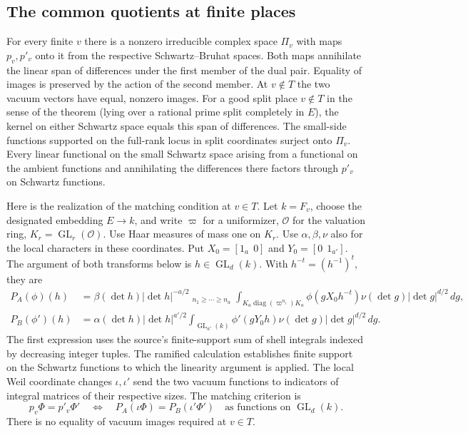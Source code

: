 \subsection{The common quotients at finite places}

For every finite \(v\) there is a nonzero irreducible complex space
\(\Pi_v\) with maps \(p_v,p'_v\) onto it from the respective
Schwartz--Bruhat spaces. Both maps annihilate the linear span of
differences under the first member of the dual pair. Equality of
images is preserved by the action of the second member. At \(v\notin T\)
the two vacuum vectors have equal, nonzero images. For a good split
place \(v\notin T\) in the sense of the theorem (lying over a rational
prime split completely in \(E\)), the kernel on either Schwartz space
equals this span of differences. The small-side functions supported
on the full-rank locus in split coordinates surject onto \(\Pi_v\).
Every linear functional on the small Schwartz space arising from a
functional on the ambient functions and annihilating the differences
there factors through \(p'_v\) on Schwartz functions.

Here is the realization of the matching condition at \(v\in T\).
Let \(k=F_v\), choose the designated embedding \(E\longrightarrow k\),
and write \(\varpi\) for a uniformizer, \(\mathcal O\) for the
valuation ring, \(K_r=\operatorname{GL}_r(\mathcal O)\).
Use Haar measures of mass one on \(K_r\).
Use \(\alpha,\beta,\nu\) also for the local characters in these
coordinates. Put \(X_0=[1_a\ \ 0]\) and \(Y_0=[0\ \ 1_{a'}]\).
The argument of both transforms below is \(h\in\operatorname{GL}_d(k)\).
With \(h^{-t}=(h^{-1})^t\), they are
\begin{align*}
 P_A(\phi)(h)
   &=\beta(\det h)|\det h|^{-a/2}
     \mathop{\sum\nolimits^{\mathrm{fin}}}_{n_1\geq\cdots\geq n_a}
       \int_{K_a\operatorname{diag}(\varpi^{n_i})K_a}
       \phi(gX_0h^{-t})\nu(\det g)|\det g|^{d/2}\,dg,\\
 P_B(\phi')(h)
   &=\alpha(\det h)|\det h|^{a'/2}
       \int_{\operatorname{GL}_{a'}(k)}
       \phi'(gY_0h)\nu(\det g)|\det g|^{d/2}\,dg .
\end{align*}
The first expression uses the source's finite-support sum of shell
integrals indexed by decreasing integer tuples. The ramified
calculation establishes finite support on the Schwartz functions
to which the linearity argument is applied. The local Weil coordinate
changes \(\iota,\iota'\) send the two vacuum functions to indicators
of integral matrices of their respective sizes. The matching criterion is
\[
       p_v\Phi=p'_v\Phi'
        \quad\Longleftrightarrow\quad
       P_A(\iota\Phi)=P_B(\iota'\Phi')
           \quad\text{as functions on }\operatorname{GL}_d(k).
\]
There is no equality of vacuum images required at \(v\in T\).

